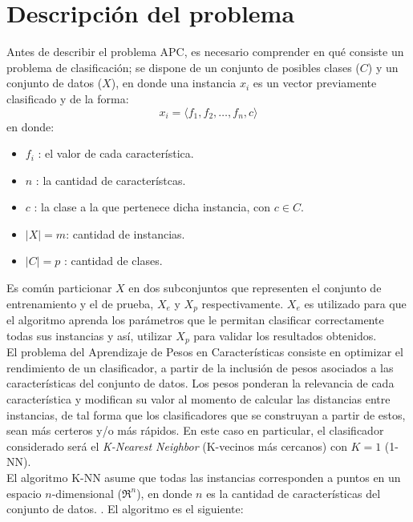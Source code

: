 \documentclass{ci5652}
\begin{document}

\section{Descripción del problema}

Antes de describir el problema APC, es necesario comprender en qué consiste
un problema de clasificación; se dispone de un conjunto de posibles clases
($C$) y un conjunto de datos ($X$), en donde una instancia $x_i$ es un vector
previamente clasificado y de la forma:
$$x_i = \langle f_1, f_2, \dots, f_n, c\rangle $$ en donde:

\begin{itemize}
  \item $f_i$ : el valor de cada característica.
  \item $n$ : la cantidad de característcas.
  \item $c$ : la clase a la que pertenece dicha instancia, con $c \in C$.
  \item $|X| = m$: cantidad de instancias.
  \item $|C| = p$ : cantidad de clases.
\end{itemize}

Es común particionar $X$ en dos subconjuntos que representen el conjunto de
entrenamiento y el de prueba, $X_e$ y $X_p$ respectivamente. $X_e$ es utilizado
para que el algoritmo aprenda los parámetros que le permitan clasificar
correctamente todas sus instancias y así, utilizar $X_p$ para validar los
resultados obtenidos.\\

El problema del Aprendizaje de Pesos en Características consiste en optimizar el
rendimiento de un clasificador, a partir de la inclusión de pesos asociados a
las características del conjunto de datos. Los pesos ponderan la relevancia de
cada característica y modifican su valor al momento de calcular las distancias
entre instancias, de tal forma que los clasificadores que se construyan a partir
de estos, sean más certeros y/o más rápidos. En este caso en particular, el
clasificador considerado será el \textit{K-Nearest Neighbor} (K-vecinos más
cercanos) con $K=1$ (1-NN).\\

El algoritmo K-NN asume que todas las instancias corresponden a puntos en un
espacio $n$-dimensional ($\Re^n$), en donde $n$ es la cantidad de
características del conjunto de datos. \cite{Mitchell_1997}. El algoritmo es el
siguiente:
\end{document}
